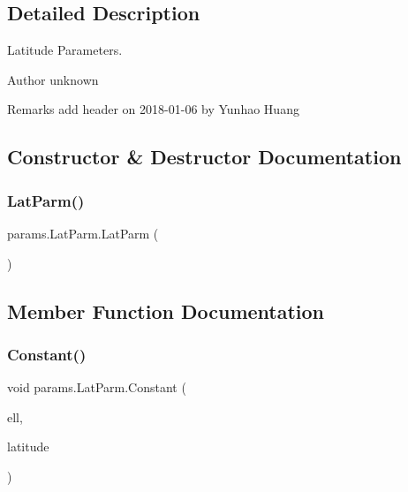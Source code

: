 \subsection{Detailed Description}
Latitude Parameters. 

\begin{DoxyAuthor}{Author}
unknown 
\end{DoxyAuthor}
\begin{DoxyRemark}{Remarks}
add header on 2018-\/01-\/06 by Yunhao Huang 
\end{DoxyRemark}


\subsection{Constructor \& Destructor Documentation}
\mbox{\label{classparams_1_1_lat_parm_ac972450505dda8d2633ee4c293339f4d}} 
\subsubsection{\texorpdfstring{Lat\+Parm()}{LatParm()}}
{\footnotesize\ttfamily params.\+Lat\+Parm.\+Lat\+Parm (\begin{DoxyParamCaption}{ }\end{DoxyParamCaption})}



\subsection{Member Function Documentation}
\mbox{\label{classparams_1_1_lat_parm_ab81d2c45f65a3a260dd99fcc49235e8b}} 
\subsubsection{\texorpdfstring{Constant()}{Constant()}}
{\footnotesize\ttfamily void params.\+Lat\+Parm.\+Constant (\begin{DoxyParamCaption}\item[{\hyperlink{classparams_1_1_ellipsoid_parms}{Ellipsoid\+Parms}}]{ell,  }\item[{double}]{latitude }\end{DoxyParamCaption})}

